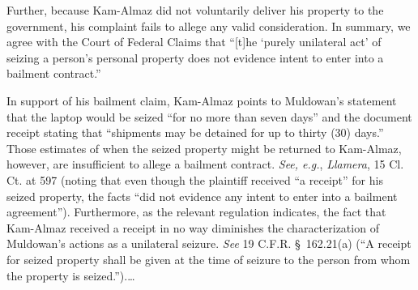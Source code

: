Further, because Kam-Almaz did not voluntarily
deliver his property to the government, his complaint fails to allege any valid
consideration.
In summary, we
agree with the Court of Federal Claims that ``[t]he `purely unilateral act' of
seizing a person's personal property does not evidence intent to enter into a
bailment contract.''

In support of his bailment claim, Kam-Almaz points to Muldowan's statement that
the laptop would be seized ``for no more than seven days'' and the document
receipt stating that ``shipments may be detained for up to thirty (30) days.''
Those estimates of when the seized property might be returned to
Kam-Almaz, however, are insufficient to allege a bailment contract.
\textit{See, e.g.}, \textit{Llamera}, 15 Cl. Ct. at 597 (noting that even though
the plaintiff received ``a receipt'' for his seized property, the facts ``did
not evidence any intent to enter into a bailment agreement'').
Furthermore, as the relevant
regulation indicates, the fact that Kam-Almaz received a receipt in no way
diminishes the characterization of Muldowan's actions as a unilateral seizure.
\textit{See} 19 C.F.R. \S~162.21(a) (``A receipt for seized property shall be
given at the time of seizure to the person from whom the property is
seized.'').\ldots

